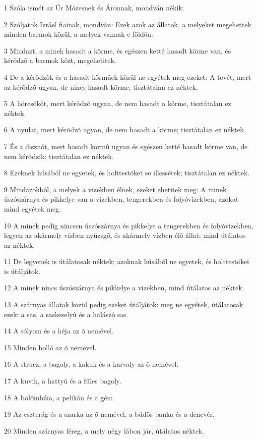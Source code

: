 \par 1 Szóla ismét az Úr Mózesnek és Áronnak, mondván nékik:
\par 2 Szóljatok Izráel fiainak, mondván: Ezek azok az állatok, a melyeket megehettek minden barmok közül, a melyek vannak e földön:
\par 3 Mindazt, a minek hasadt a körme, és egészen ketté hasadt körme van, és kérõdzõ a barmok közt, megehetitek.
\par 4 De a kérõdzõk és a hasadt körmûek közül ne egyétek meg ezeket: A tevét, mert az kérõdzõ ugyan, de nincs hasadt körme, tisztátalan ez néktek.
\par 5 A hörcsököt, mert kérõdzõ ugyan, de nem hasadt a körme, tisztátalan ez néktek.
\par 6 A nyulat, mert kérõdzõ ugyan, de nem hasadt a körme; tisztátalan ez néktek.
\par 7 És a disznót, mert hasadt körmû ugyan és egészen ketté hasadt körme van, de nem kérõdzik; tisztátalan ez néktek.
\par 8 Ezeknek húsából ne egyetek, és holttestöket se illessétek; tisztátalan ez néktek.
\par 9 Mindazokból, a melyek a vizekben élnek, ezeket ehetitek meg: A minek úszószárnya és pikkelye van a vizekben, tengerekben és folyóvizekben, azokat mind egyétek meg.
\par 10 A minek pedig nincsen úszószárnya és pikkelye a tengerekben és folyóvizekben, legyen az akármely vízben nyüzsgõ, és akármely vízben élõ állat; mind útálatos az néktek.
\par 11 De legyenek is útálatosak néktek; azoknak húsából ne egyetek, és holttestöket is útáljátok.
\par 12 A minek nincs úszószárnya és pikkelye a vizekben, mind útálatos az néktek.
\par 13 A szárnyas állatok közül pedig ezeket útáljátok: meg ne egyétek, útálatosak ezek: a sas, a saskeselyû és a halászó sas.
\par 14 A sólyom és a héja az õ nemével.
\par 15 Minden holló az õ nemével.
\par 16 A strucz, a bagoly, a kakuk és a karvaly az õ nemével.
\par 17 A kuvik, a hattyú és a füles bagoly.
\par 18 A bölömbika, a pelikán és a gém.
\par 19 Az eszterág és a szarka az õ nemével, a büdös banka és a denevér.
\par 20 Minden szárnyas féreg, a mely négy lábon jár, útálatos néktek.
